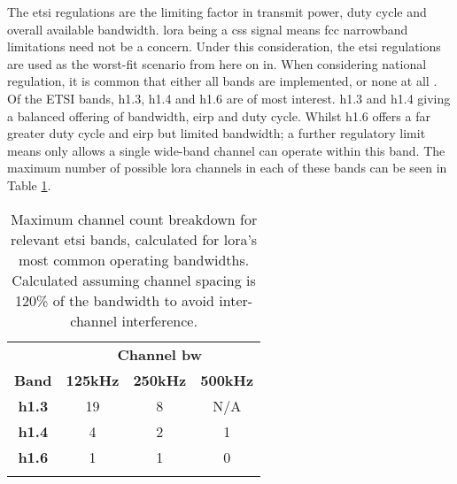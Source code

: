The \ac{etsi} regulations are the limiting factor in transmit power, duty cycle and overall available bandwidth. \ac{lora} being a \ac{css} signal means \ac{fcc} narrowband limitations need not be a concern. Under this consideration, the \ac{etsi} regulations are used as the worst-fit scenario from here on in. When considering national regulation, it is common that either all bands are implemented, or none at all \cite{3YP:CEPT_ERC_REC}. Of the ETSI bands, h1.3, h1.4 and h1.6 are of most interest. h1.3 and h1.4 giving a balanced offering of bandwidth, \ac{eirp} and duty cycle. Whilst h1.6 offers a far greater duty cycle and \ac{eirp} but limited bandwidth; a further regulatory limit means only allows a single wide-band channel can operate within this band. The maximum number of possible \ac{lora} channels in each of these bands can be seen in Table \ref{tab:ETSILoraChannels}.
\vspace{2.5mm}
\begin{table}[H]
\centering\small
\caption[Maximum channel breakdown for \ac{lora}]{Maximum channel count breakdown for relevant \ac{etsi} bands, calculated for \ac{lora}'s most common operating bandwidths. Calculated assuming channel spacing is 120\%  of the bandwidth to avoid inter-channel interference.}
\label{tab:ETSILoraChannels}
\renewcommand*{\arraystretch}{1.1}
\begin{tabular}{c|ccc}
    \toprule
    & \multicolumn{3}{c}{\textbf{Channel \ac{bw}}}	\\
    \textbf{Band} & \textbf{125kHz} & \textbf{250kHz} & \textbf{500kHz}\\
    \midrule\addlinespace
    \textbf{h1.3} & 19 & 8 & N/A \\
    \textbf{h1.4} & 4 & 2 & 1 \\
    \textbf{h1.6} & 1 & 1 & 0 \\
    \addlinespace\bottomrule
\end{tabular}
\end{table}
